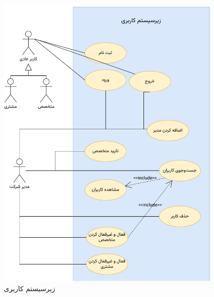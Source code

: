 \begin{figure}[ht!]
\centering
		\includegraphics[scale=0.8, page=1]{figs/usecase.pdf}
\caption{زیرسیستم کاربری}
\end{figure}

\FloatBarrier
\newpage


